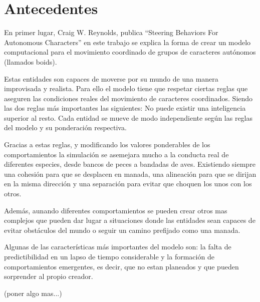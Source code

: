 \section{Antecedentes}
\label{section:antecedentes}

En primer lugar, Craig W. Reynolds, publica “Steering Behaviors For Autonomous Characters” en este trabajo se explica la forma de crear un modelo computacional para el movimiento 
coordinado de grupos de caracteres autónomos (llamados boids).
 
Estas entidades son capaces de moverse por su mundo de una manera improvisada y realista. Para ello el modelo tiene que respetar ciertas reglas que aseguren las condiciones reales 
del movimiento de caracteres coordinados. Siendo las dos reglas más importantes las siguientes:
No puede existir una inteligencia superior al resto.
Cada entidad se mueve de modo independiente según las reglas del modelo y su ponderación respectiva.
 
Gracias a estas reglas, y modificando los valores ponderables de los comportamientos la simulación se asemejara mucho a la conducta real de diferentes especies, desde bancos de 
peces a bandadas de aves. Existiendo siempre una cohesión para que se desplacen en manada, una alineación para que se dirijan en la misma dirección y una separación para evitar que
choquen los unos con los otros.
 
Además, aunando diferentes comportamientos se pueden crear otros mas complejos que pueden dar lugar a situaciones donde las entidades sean capaces de evitar obstáculos del mundo o 
seguir un camino prefijado como una manada.
 
Algunas de las características más importantes del modelo son: la falta de predictibilidad en un lapso de tiempo considerable y la formación de comportamientos emergentes, es decir, 
que no estan planeados y que pueden sorprender al propio creador.
 
(poner algo mas...)
